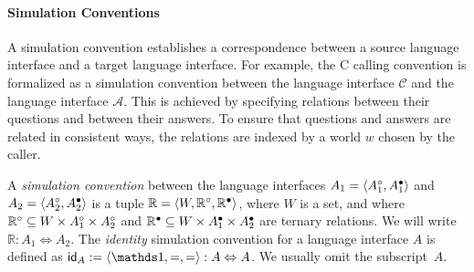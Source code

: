 %
%

\paragraph{Simulation Conventions} \label{sec:simconv} %

A simulation convention establishes a correspondence between
a source language interface and
a target language interface.
For example,
the C calling convention is formalized as a 
simulation convention between
the language interface $\mathcal{C}$ and
the language interface $\mathcal{A}$.
This is achieved
by specifying relations between their questions and between their answers.
To ensure that questions and answers are related in consistent ways,
the relations are indexed by a world $w$ chosen by the caller.

\begin{definition} \label{def:simconv} %
A \emph{simulation convention} between the language interfaces
$A_1 = \langle A_1^\circ, A_1^\bullet \rangle$ and
$A_2 = \langle A_2^\circ, A_2^\bullet \rangle$
is a tuple $\mathbb{R} = \langle W, \mathbb{R}^\circ, \mathbb{R}^\bullet \rangle$,
where $W$ is a set,
and where
$\mathbb{R}^\circ \subseteq W \times A_1^\circ \times A_2^\circ$
and $\mathbb{R}^\bullet \subseteq W \times A_1^\bullet \times A_2^\bullet$
are ternary relations.
We will write $\mathbb{R} : A_1 \Leftrightarrow A_2$.
The \emph{identity} simulation convention
for a language interface $A$
is defined as
$\kw{id}_A := \langle \unitset, {=}, {=} \rangle
  : A \Leftrightarrow A$.
We usually omit the subscript~$A$.
\end{definition}


